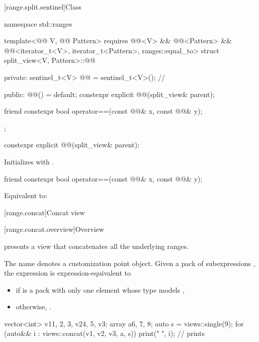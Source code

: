 [range.split.sentinel]{Class }

\begin{codeblock}
namespace std::ranges {
  template<@@ V, @@ Pattern>
    requires @@<V> && @@<Pattern> &&
             @@<iterator_t<V>, iterator_t<Pattern>, ranges::equal_to>
  struct split_view<V, Pattern>::@@ {
  private:
    sentinel_t<V> @@ = sentinel_t<V>();               // \expos

  public:
    @@() = default;
    constexpr explicit @@(split_view& parent);

    friend constexpr bool operator==(const @@& x, const @@& y);
  };
}
\end{codeblock}

\begin{itemdecl}
constexpr explicit @@(split_view& parent);
\end{itemdecl}

\begin{itemdescr}
\pnum
\effects
Initializes  with .
\end{itemdescr}

\begin{itemdecl}
friend constexpr bool operator==(const @@& x, const @@& y);
\end{itemdecl}

\begin{itemdescr}
\pnum
\effects
Equivalent to: 
\end{itemdescr}

[range.concat]{Concat view}

[range.concat.overview]{Overview}

\pnum
{} presents a view that concatenates all the underlying ranges.

\pnum
The name  denotes
a customization point object.
Given a pack of subexpressions ,
the expression  is expression-equivalent to
\begin{itemize}
\item {} if  is a pack with only one element
whose type models ,
\item otherwise, .
\end{itemize}
\begin{example}
\begin{codeblock}
vector<int> v1{1, 2, 3}, v2{4, 5}, v3{};
array a{6, 7, 8};
auto s = views::single(9);
for (auto&& i : views::concat(v1, v2, v3, a, s)) {
  print("{} ", i);      // prints 
}
\end{codeblock}
\end{example}


